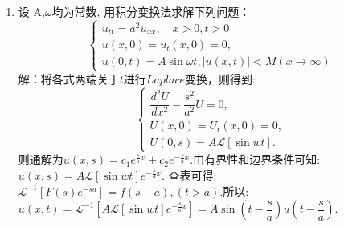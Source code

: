 \documentclass[11pt]{article}
\begin{document}
\begin{enumerate}
    \item 设 A,$\omega$均为常数, 用积分变换法求解下列问题：
       \begin{equation*}
    \left\{
     \begin{array}{lr}
     u_{tt}=a^2u_{xx},\quad x>0,  t>0\\u(x,0)=u_t(x,0)=0,\\u(0,t)=A\sin\omega t,|u(x,t)|<M(x\rightarrow \infty)
     \end{array}
    \right.
    \end{equation*}
        解：将各式两端关于$t$进行$Laplace$变换，则得到:
    \begin{equation*}
        \left\{
         \begin{array}{lr}
         \dfrac{d^2 U}{dx^2}-\dfrac{s^2}{a^2}U=0,\\U(x,0)=U_t (x,0)=0,\\U(0,s)=A\mathscr{L}[\sin wt].
         \end{array}
        \right.
     \end{equation*}
    则通解为$u(x,s)=c_1 e^{\frac{s}{a}x}+c_2 e^{-\frac{s}{a}x}$.由有界性和边界条件可知:\\
    $u(x,s)=A\mathscr{L}[\sin wt] e^{-\frac{s}{a}x}$.  查表可得:$\mathscr{L}^{-1}[F(s)e^{-sa}]=f(s-a),(t>a)$.所以:
    \\ $u(x,t)=\mathscr{L}^{-1}[A\mathscr{L}[\sin wt]e^{-\frac{s}{a}x}]=A\sin(t-\dfrac{s}{a})u(t-\dfrac{s}{a})$.
    \end{enumerate}

    \setlength{\topmargin}{-18mm}
\end{document}
